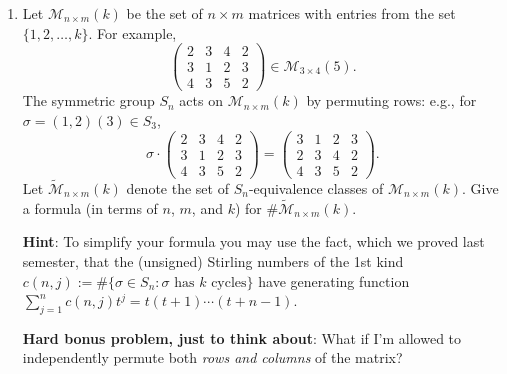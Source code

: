 \documentclass[11pt]{article}
\begin{document}
\begin{enumerate}
\item Let $\mathcal{M}_{n \times m}(k)$ be the set of $n \times m$ matrices with entries from the set $\{1,2,\ldots,k\}$. For example,
\[ \begin{pmatrix} 2 & 3 & 4 & 2 \\
3 & 1 & 2 & 3 \\
4 & 3 & 5 & 2 \end{pmatrix} \in \mathcal{M}_{3 \times 4}(5).\]
The symmetric group $S_n$ acts on $\mathcal{M}_{n \times m}(k)$ by permuting rows: e.g., for $\sigma = (1,2)(3) \in S_3$,
\[ \sigma \cdot \begin{pmatrix} 2 & 3 & 4 & 2 \\
3 & 1 & 2 & 3 \\
4 & 3 & 5 & 2 \end{pmatrix} = \begin{pmatrix} 3 & 1 & 2 & 3 \\
2 & 3 & 4 & 2 \\
4 & 3 & 5 & 2 \end{pmatrix} .\]
Let $\widetilde{\mathcal{M}}_{n \times m}(k)$ denote the set of $S_n$-equivalence classes of $\mathcal{M}_{n \times m}(k)$.  Give a formula (in terms of $n$, $m$, and $k$) for $\#\widetilde{\mathcal{M}}_{n \times m}(k)$.

{\bf Hint}: To simplify your formula you may use the fact, which we proved last semester, that the (unsigned) Stirling numbers of the 1st kind $c(n,j) := \# \{\sigma \in S_n\colon \textrm{$\sigma$ has $k$ cycles}\}$ have generating function $\sum_{j=1}^{n} c(n,j)t^j = t(t+1)\cdots (t+n-1)$.

{\bf Hard bonus problem, just to think about}: What if I'm allowed to independently permute both \emph{rows and columns} of the matrix?

\end{enumerate}
\end{document}
